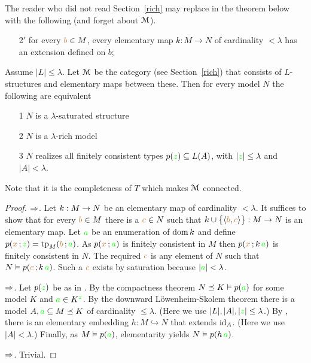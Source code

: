 \begin{remark}
The reader who did not read Section~\ref{rich} may replace  in the theorem below with the following (and forget about $\EuScript M$).
\begin{itemize}
\item[2$'$] for every ${\color{brown} b}\in M$,  every elementary map $k:M\to N$ of cardinality $<\lambda$ has an extension defined on $b$;
\end{itemize}
\end{remark}

\begin{theorem}\label{saturo->ricco}
Assume $|L|\le\lambda$.
Let $\EuScript M$ be the category (see Section~\ref{rich}) that consists of $L$-structures and elementary maps between these.
Then for every model $N$ the following are equivalent
\begin{itemize}
\item[1] $N$ is a $\lambda$-saturated structure
\item[2] $N$ is a $\lambda$-rich model
\item[3] $N$ realizes all finitely consistent types $p({\color{green} z})\subseteq L(A)$, with $|{\color{green} z}|\le\lambda$ and $|A|<\lambda$.
\end{itemize}
\end{theorem}

Note that it is the completeness of $T$ which makes $\EuScript M$ connected.

\vspace*{-\parskip}
\begin{proof}
$\Rightarrow$.
Let $k:M\rightarrow N$ be an elementary map of cardinality $<\lambda$.
It suffices to show that for every ${\color{brown} b}\in M$ there is a ${\color{brown} c}\in N$ such that $k\cup\big\{\langle{\color{brown}b},{\color{brown} c}\rangle\big\}:M\to N$ is an elementary map.
Let ${\color{green} a}$ be an enumeration of $\mathop{\rm dom} k$ and define $p({\color{brown} x}\,;{\color{green} z})={\rm tp}_M({\color{brown} b}\,;{\color{green} a})$.
As $p({\color{brown} x}\,;{\color{green} a})$ is finitely consistent in $M$ then $p({\color{brown} x}\,;k\,{\color{green} a})$ is finitely consistent in $N$.
The required ${\color{brown} c}$ is any element of $N$ such that $N\vDash p({\color{brown} c}\,;k\,{\color{green} a})$. Such a ${\color{brown} c}$ exists by saturation because $|{\color{green} a}|<\lambda$.

$\Rightarrow$.
Let $p({\color{green} z})$ be as in .
By the compactness theorem $N\preceq K\vDash p({\color{green} a})$ for some model $K$ and ${\color{green} a}\in K^{\color{green} z}$.
By the downward  L\"owenheim-Skolem theorem there is a model $A,{\color{green} a}\subseteq M\preceq K$ of cardinality $\le\lambda$.
(Here we use $|L|,|A|,|{\color{green} z}|\le\lambda$.)
By , there is an elementary embedding $h:M\hookrightarrow N$ that extends ${\rm id}_A$.
(Here we use $|A|<\lambda$.)
Finally, as $M\vDash p({\color{green} a})$,  elementarity yields $N\vDash p(h\,{\color{green} a})$.

$\Rightarrow$.
Trivial. 
\end{proof}

